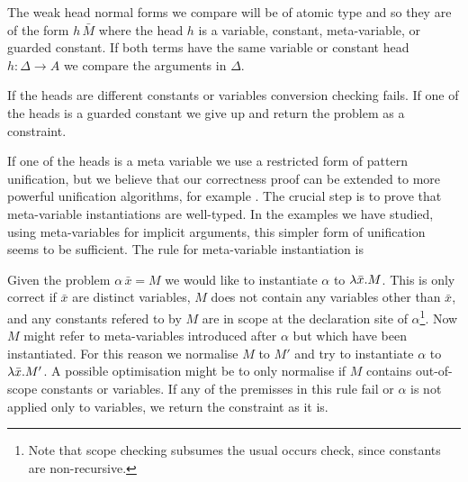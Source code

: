 The weak head normal forms we compare will be of atomic type and so they are of
the form $h\,\bar M$ where the head $h$ is a variable, constant, meta-variable,
or guarded constant. If both terms have the same variable or constant head $h :
\Delta \to A$ we compare the arguments in $\Delta$.


If the heads are different constants or variables conversion checking fails.
If one of the heads is a guarded constant we give up and return the problem as
a constraint.


If one of the heads is a meta variable we use a restricted form of pattern
unification, but we believe that our correctness proof can be extended to more
powerful unification algorithms, for example
\cite{dowek:matching,dowek:unification,miller:pattern,Nipkow-LICS-93,pfenning:unification}. The crucial step is
to prove that meta-variable instantiations are well-typed.
In the examples we have studied, using meta-variables for
implicit arguments, this simpler form of unification seems to be sufficient.
The rule for meta-variable instantiation is


Given the problem $\alpha \, \bar x = M$ we would like to instantiate $\alpha$ to
$\lambda \bar x.{} M$. This is only correct if $\bar x$ are distinct variables, $M$
does not contain any variables other than $\bar x$, and any constants refered
to by $M$ are in scope at the declaration site of $\alpha$\footnote{Note that
scope checking subsumes the usual occurs check, since constants are non-recursive.}.
Now $M$ might refer to meta-variables introduced after $\alpha$ but which have
been instantiated.  For this reason we normalise $M$ to $M'$ and try to
instantiate $\alpha$ to $\lambda \bar x.{} M'$. A possible optimisation might be to
only normalise if $M$ contains out-of-scope constants or variables.
If any of the premisses in this rule fail or $\alpha$ is not applied only to
variables, we return the constraint as it is.

